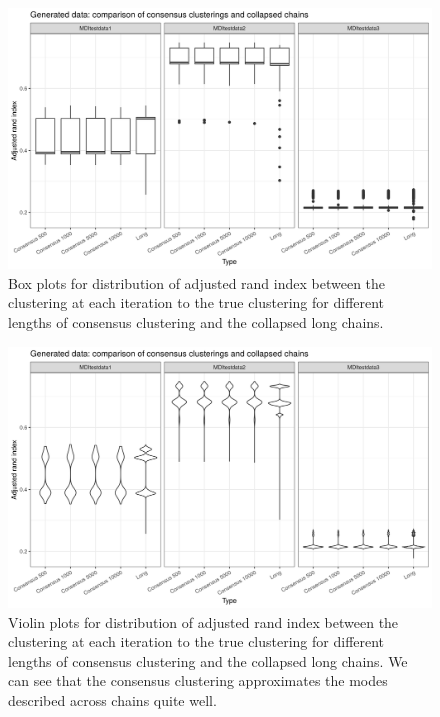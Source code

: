 \documentclass[12pt]{article} %
\begin{document}

	\begin{figure}[!htb]
		\centering
		\includegraphics[scale=0.65]{Images/Gen_data/Case_2/box_plot_ari_true_clustering_collapsed_long.png}
		\caption{Box plots for distribution of adjusted rand index between the clustering at each iteration to the true clustering for different lengths of consensus clustering and the collapsed long chains.}
		\label{fig:gen_data_case_2_collapsed_boxplot}
	\end{figure}
	

	\begin{figure}[h]
		\centering
		\includegraphics[scale=0.65]{Images/Gen_data/Case_2/violin_plot_ari_true_clustering_collapsed_long.png}
		\caption{Violin plots for distribution of adjusted rand index between the clustering at each iteration to the true clustering for different lengths of consensus clustering and the collapsed long chains. We can see that the consensus clustering approximates the modes described across chains quite well.}
		\label{fig:gen_data_case_2_collapsed_violin_plot}
	\end{figure}
\end{document}
